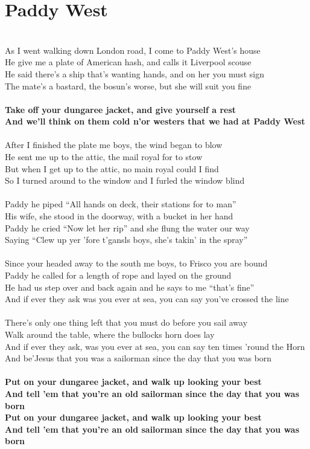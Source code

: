 \documentclass[letterpaper,9pt]{article}
\begin{document}
\section{Paddy West}
\noindent
\\As I went walking down London road, I come to Paddy West's house
\\He give me a plate of American hash, and calls it Liverpool scouse
\\He said there's a ship that's wanting hands, and on her you must sign
\\The mate's a bastard, the bosun's worse, but she will suit you fine
\\
\\\textbf{Take off your dungaree jacket, and give yourself a rest
\\And we'll think on them cold n'or westers that we had at Paddy West}
\\
\\After I finished the plate me boys, the wind began to blow
\\He sent me up to the attic, the mail royal for to stow
\\But when I get up to the attic, no main royal could I find
\\So I turned around to the window and I furled the window blind
\\
\\Paddy he piped “All hands on deck, their stations for to man”
\\His wife, she stood in the doorway, with a bucket in her hand
\\Paddy he cried “Now let her rip” and she flung the water our way
\\Saying “Clew up yer 'fore t'gansls boys, she's takin' in the spray”
\\
\\Since your headed away to the south me boys, to Frisco you are bound
\\Paddy he called for a length of rope and layed on the ground
\\He had us step over and back again and he says to me “that's fine”
\\And if ever they ask was you ever at sea, you can say you've crossed the line
\\
\\There's only one thing left that you must do before you sail away
\\Walk around the table, where the bullocks horn does lay
\\And if ever they ask, was you ever at sea, you can say ten times 'round the Horn
\\And be'Jesus that you was a sailorman since the day that you was born
\\
\\\textbf{Put on your dungaree jacket, and walk up looking your best
\\And tell 'em that you're an old sailorman since the day that you was born
\\Put on your dungaree jacket, and walk up looking your best
\\And tell 'em that you're an old sailorman since the day that you was born}
\end{document}
